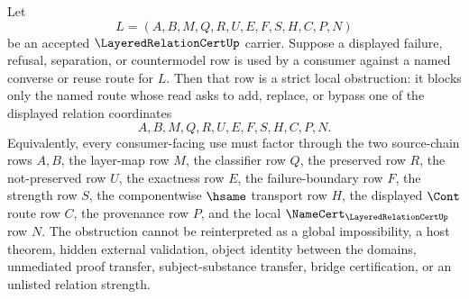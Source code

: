\begin{corollary}
\label{cor:layered-relation-cert-strict-local-obstruction}
Let
$$
L=(A,B,M,Q,R,U,E,F,S,H,C,P,N)
$$
be an accepted $\LayeredRelationCertUp$ carrier. Suppose a displayed failure, refusal, separation, or countermodel row is used by a consumer against a named converse or reuse route for $L$. Then that row is a strict local obstruction: it blocks only the named route whose read asks to add, replace, or bypass one of the displayed relation coordinates
$$
A,B,M,Q,R,U,E,F,S,H,C,P,N.
$$
Equivalently, every consumer-facing use must factor through the two source-chain rows $A,B$, the layer-map row $M$, the classifier row $Q$, the preserved row $R$, the not-preserved row $U$, the exactness row $E$, the failure-boundary row $F$, the strength row $S$, the componentwise $\hsame$ transport row $H$, the displayed $\Cont$ route row $C$, the provenance row $P$, and the local $\NameCert_{\LayeredRelationCertUp}$ row $N$. The obstruction cannot be reinterpreted as a global impossibility, a host theorem, hidden external validation, object identity between the domains, unmediated proof transfer, subject-substance transfer, bridge certification, or an unlisted relation strength.
\end{corollary}
